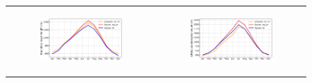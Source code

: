 \begin{figure}[htbp]
\begin{tabular}{cc}
        \begin{subfigure}[b]{0.5\textwidth}
            \caption{}
            \includegraphics[width=\textwidth]{images/chap4/future/SC_s_pblh_presfutirr.png}
        \end{subfigure} &
        \begin{subfigure}[b]{0.5\textwidth}
            \caption{}
            \includegraphics[width=\textwidth]{images/chap4/future/SC_s_lcl_presfutirr.png}
        \end{subfigure} \\
    \end{tabular}
    \caption{}
    \label{fig:diffmaps_future_irr}
\end{figure}


